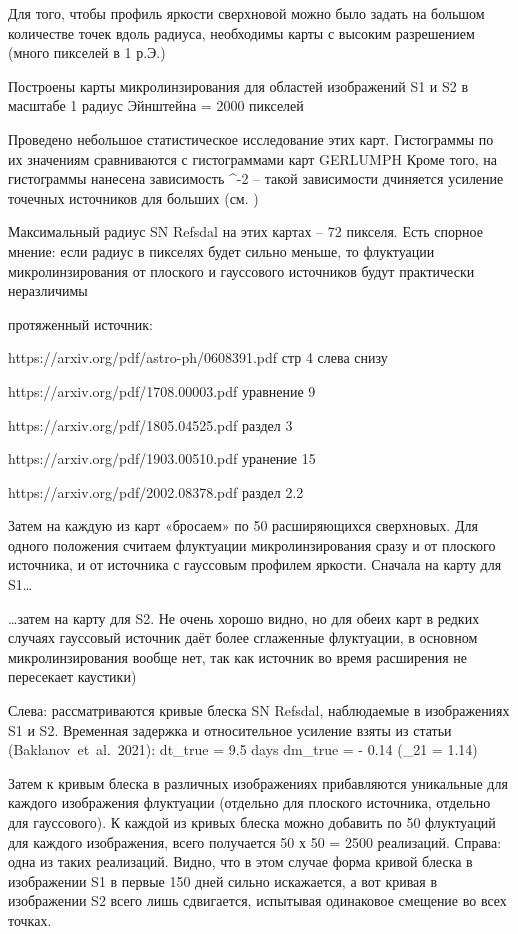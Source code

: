 Для того, чтобы профиль яркости сверхновой
можно было задать на большом количестве
точек вдоль радиуса, необходимы карты с
высоким разрешением (много пикселей в 1 р.Э.)

Построены карты микролинзирования для областей изображений S1 и S2 в масштабе 1 радиус Эйнштейна = 2000 пикселей

Проведено небольшое статистическое исследование этих карт. Гистограммы по их значениям сравниваются с гистограммами карт GERLUMPH  \cite{gerlumph}
Кроме того, на гистограммы нанесена зависимость \mu^{-2} – такой зависимости дчиняется усиление точечных источников для больших \mu 
(см. \cite{wambsganss1992-microlens})

Максимальный радиус SN Refsdal на этих картах – 72 пикселя. Есть спорное мнение: если радиус в пикселях будет сильно меньше, то флуктуации микролинзирования от плоского и гауссового источников будут практически неразличимы


протяженный источник:

https://arxiv.org/pdf/astro-ph/0608391.pdf стр 4 слева снизу

https://arxiv.org/pdf/1708.00003.pdf уравнение 9

https://arxiv.org/pdf/1805.04525.pdf раздел 3

https://arxiv.org/pdf/1903.00510.pdf уранение 15

https://arxiv.org/pdf/2002.08378.pdf раздел 2.2

Затем на каждую из карт «бросаем» по 50 расширяющихся сверхновых. Для одного положения считаем флуктуации микролинзирования сразу и от плоского источника, и от источника с гауссовым профилем яркости. Сначала на карту для S1… 

…затем на карту для S2. Не очень хорошо видно, но для обеих карт в редких случаях гауссовый источник даёт более сглаженные флуктуации, в основном микролинзирования вообще нет, так как источник во время расширения не пересекает каустики)

Слева: рассматриваются кривые блеска SN Refsdal, наблюдаемые в изображениях S1 и S2. Временная задержка и относительное усиление взяты из статьи (Baklanov et al. 2021):
dt_true = 9.5 days
dm_true = - 0.14
(\mu_{21} = 1.14)

Затем к кривым блеска в различных изображениях прибавляются уникальные для каждого изображения флуктуации (отдельно для плоского источника, отдельно для гауссового). К каждой из кривых блеска можно добавить по 50 флуктуаций для каждого изображения, всего получается 50 х 50 = 2500 реализаций.
Справа: одна из таких реализаций. Видно, что в этом случае форма кривой блеска в изображении S1 в первые 150 дней сильно искажается, а вот кривая в изображении S2 всего лишь сдвигается, испытывая одинаковое смещение во всех точках.  

